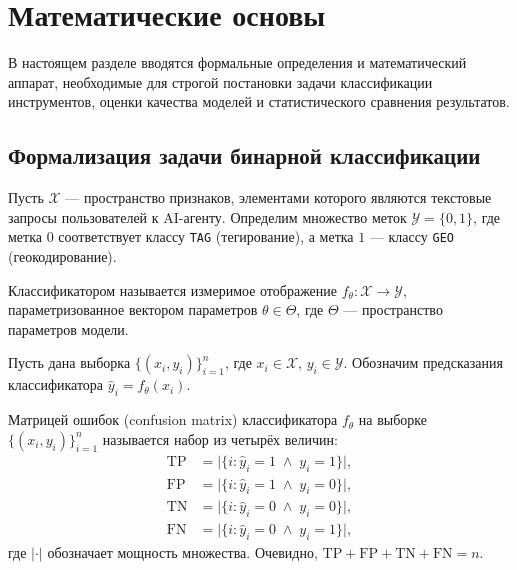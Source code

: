 
\section{Математические основы} \label{sec:background}

В настоящем разделе вводятся формальные определения и математический аппарат,
необходимые для строгой постановки задачи классификации инструментов, оценки
качества моделей и статистического сравнения результатов.

\subsection{Формализация задачи бинарной классификации}
\label{subsec:binary-classification}

Пусть $\mathcal{X}$ --- пространство признаков, элементами которого являются
текстовые запросы пользователей к AI-агенту. Определим множество меток
$\mathcal{Y} = \{0, 1\}$, где метка $0$ соответствует классу \texttt{TAG}
(тегирование), а метка $1$ --- классу \texttt{GEO} (геокодирование).

\begin{definition}[Классификатор]
\label{def:classifier}
Классификатором называется измеримое отображение
$f_\theta \colon \mathcal{X} \to \mathcal{Y}$,
параметризованное вектором параметров $\theta \in \Theta$, где
$\Theta$ --- пространство параметров модели.
\end{definition}

Пусть дана выборка $\{(x_i, y_i)\}_{i=1}^{n}$, где
$x_i \in \mathcal{X}$, $y_i \in \mathcal{Y}$.
Обозначим предсказания классификатора $\hat{y}_i = f_\theta(x_i)$.

\begin{definition}
\label{def:confusion-matrix}
Матрицей ошибок (confusion matrix) классификатора $f_\theta$ на выборке $\{(x_i, y_i)\}_{i=1}^{n}$ называется набор из четырёх величин:
\begin{align}
    \mathrm{TP} &= \bigl|\{i : \hat{y}_i = 1 \;\wedge\; y_i = 1\}\bigr|, \label{eq:tp} \\
    \mathrm{FP} &= \bigl|\{i : \hat{y}_i = 1 \;\wedge\; y_i = 0\}\bigr|, \label{eq:fp} \\
    \mathrm{TN} &= \bigl|\{i : \hat{y}_i = 0 \;\wedge\; y_i = 0\}\bigr|, \label{eq:tn} \\
    \mathrm{FN} &= \bigl|\{i : \hat{y}_i = 0 \;\wedge\; y_i = 1\}\bigr|, \label{eq:fn}
\end{align}
где $|\cdot|$ обозначает мощность множества. Очевидно,
$\mathrm{TP} + \mathrm{FP} + \mathrm{TN} + \mathrm{FN} = n$.
\end{definition}

